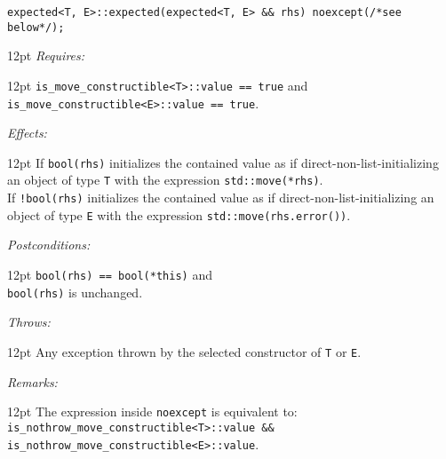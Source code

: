 \documentclass[a4paper,10pt]{article}
\newcommand{\cpp}[1]{\lstinline{#1}}
\newcommand{\wordingItem}[1]{\noindent\textit{#1:}}
\newenvironment{wordingTextItem}[1]{\wordingItem{#1}\vspace{7pt}\noindent\begin{adjustwidth}{12pt}{}}{\vspace{7pt}\end{adjustwidth}}
\newenvironment{wordingPara}{\begin{adjustwidth}{12pt}{}}{\end{adjustwidth}}
\begin{document}
\begin{lstlisting}[xleftmargin=0pt]
expected<T, E>::expected(expected<T, E> && rhs) noexcept(/*see below*/);
\end{lstlisting}
\begin{wordingPara}
\begin{wordingTextItem}{Requires}
\cpp{is_move_constructible<T>::value == true} and \\
\cpp{is_move_constructible<E>::value == true}.
\end{wordingTextItem}
\begin{wordingTextItem}{Effects}
If \cpp{bool(rhs)} initializes the contained value as if direct-non-list-initializing an object of type \cpp{T} with the expression \cpp{std::move(*rhs)}. \\

\noindent
If \cpp{!bool(rhs)} initializes the contained value as if direct-non-list-initializing an object of type \cpp{E} with the expression \cpp{std::move(rhs.error())}.
\end{wordingTextItem}
\begin{wordingTextItem}{Postconditions}
\cpp{bool(rhs) == bool(*this)} and \\
\cpp{bool(rhs)} is unchanged.
\end{wordingTextItem}
\begin{wordingTextItem}{Throws}
Any exception thrown by the selected constructor of \cpp{T} or \cpp{E}.
\end{wordingTextItem}
\begin{wordingTextItem}{Remarks}
The expression inside \cpp{noexcept} is equivalent to:\\
\cpp{is_nothrow_move_constructible<T>::value && is_nothrow_move_constructible<E>::value}.
\end{wordingTextItem}
\end{wordingPara}
\end{document}
